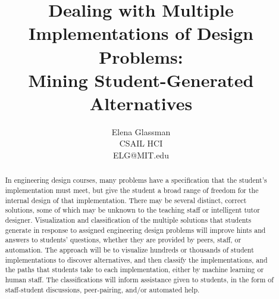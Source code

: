 \documentclass[12pt]{article}
\begin{document}
\title{Dealing with Multiple Implementations of Design Problems: \\Mining Student-Generated Alternatives}

\author{Elena Glassman \\ CSAIL HCI \\ ELG@MIT.edu
}

\maketitle

\begin{abstract}
In engineering design courses, many problems have a specification that the student's implementation must meet, but give the student a broad range of freedom for the internal design of that implementation. There may be several distinct, correct solutions, some of which may be unknown to the teaching staff or intelligent tutor designer. Visualization and classification of the multiple solutions that students generate in response to assigned engineering design problems will improve hints and answers to students' questions, whether they are provided by peers, staff, or automation. The approach will be to visualize hundreds or thousands of student implementations to discover alternatives, and then classify the implementations, and the paths that students take to each implementation, either by machine learning or human staff. The classifications will inform assistance given to students, in the form of staff-student discussions, peer-pairing, and/or automated help.%
\end{abstract}

%

%

\end{document}
